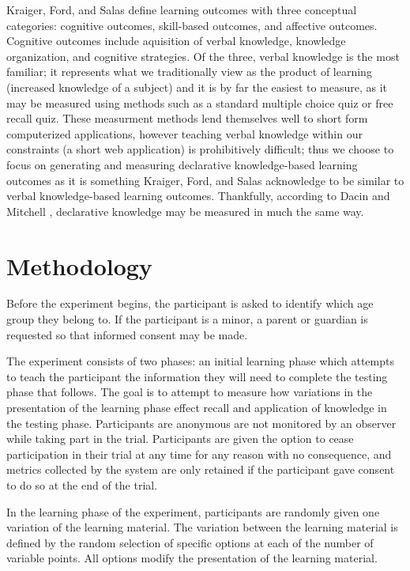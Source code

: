 \documentclass[12pt]{report}
\begin{document}
Kraiger, Ford, and Salas \cite{kraiger1993application} define learning outcomes with three conceptual categories: cognitive outcomes, skill-based outcomes, and affective outcomes. Cognitive outcomes include aquisition of verbal knowledge, knowledge organization, and cognitive strategies. Of the three, verbal knowledge is the most familiar; it represents what we traditionally view as the product of learning (increased knowledge of a subject) and it is by far the easiest to measure, as it may be measured using methods such as a standard multiple choice quiz or free recall quiz. These measurment methods lend themselves well to short form computerized applications, however teaching verbal knowledge within our constraints (a short web application) is prohibitively difficult; thus we choose to focus on generating and measuring declarative knowledge-based learning outcomes as it is something Kraiger, Ford, and Salas acknowledge to be similar to verbal knowledge-based learning outcomes. Thankfully, according to Dacin and Mitchell \cite{dacin1986measurement}, declarative knowledge may be measured in much the same way.

\chapter{Methodology}
\label{ch:Methodology}

Before the experiment begins, the participant is asked to identify which age group they belong to. If the participant is a minor, a parent or guardian is requested so that informed consent may be made.

The experiment consists of two phases: an initial learning phase which attempts to teach the participant the information they will need to complete the testing phase that follows. The goal is to attempt to measure how variations in the presentation of the learning phase effect recall and application of knowledge in the testing phase. Participants are anonymous are not monitored by an observer while taking part in the trial. Participants are given the option to cease participation in their trial at any time for any reason with no consequence, and metrics collected by the system are only retained if the participant gave consent to do so at the end of the trial.

In the learning phase of the experiment, participants are randomly given one variation of the learning material. The variation between the learning material is defined by the random selection of specific options at each of the number of variable points. All options modify the presentation of the learning material.
\end{document}
